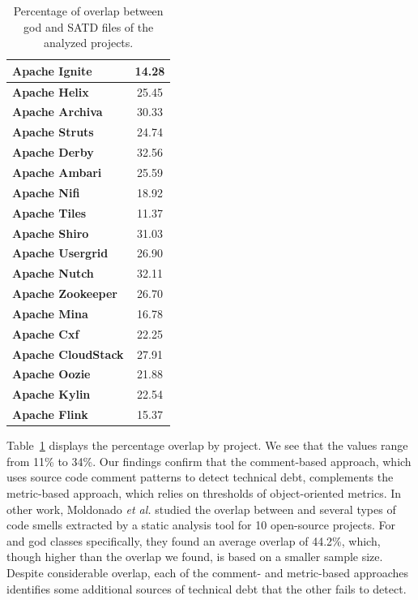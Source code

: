 \begin{table}[!htbp]
\begin{tabular}{l|c}
		\textbf{Apache Ignite}     &    14.28     \\ \hline
		\textbf{Apache Helix}      &    25.45     \\ \hline
		\textbf{Apache Archiva}    &    30.33     \\ \hline
		\textbf{Apache Struts}     &    24.74     \\ \hline
		\textbf{Apache Derby}      &    32.56     \\ \hline
		\textbf{Apache Ambari}     &    25.59     \\ \hline
		\textbf{Apache Nifi}       &    18.92     \\ \hline
		\textbf{Apache Tiles}      &    11.37     \\ \hline
		\textbf{Apache Shiro}      &    31.03     \\ \hline
		\textbf{Apache Usergrid}   &    26.90     \\ \hline
		\textbf{Apache Nutch}      &    32.11     \\ \hline
		\textbf{Apache Zookeeper}  &    26.70     \\ \hline
		\textbf{Apache Mina}       &    16.78     \\ \hline
		\textbf{Apache Cxf}        &    22.25     \\ \hline
		\textbf{Apache CloudStack} &    27.91     \\ \hline
		\textbf{Apache Oozie}      &    21.88     \\ \hline
		\textbf{Apache Kylin}      &    22.54     \\ \hline
		\textbf{Apache Flink}      &    15.37     \\ \hline
	\end{tabular}
	\caption{Percentage of overlap between god and SATD files of the analyzed projects.}
	\label{ch4_amount_of_overlap}
\end{table}

Table~\ref{ch4_amount_of_overlap} displays the percentage overlap by project. We see that the values range from 11\% to 34\%. Our findings confirm that the comment-based approach, which uses source code comment patterns to detect technical debt, complements the metric-based approach, which relies on thresholds of object-oriented metrics. In other work, Moldonado \textit{et al.} \cite{Maldonado_TSE2017} studied the overlap between \SATD and several types of code smells extracted by a static analysis tool for 10 open-source projects. For \SATD and god classes specifically, they found an average overlap of 44.2\%, which, though higher than the overlap we found, is based on a smaller sample size. Despite considerable overlap, each of the comment- and metric-based approaches identifies some additional sources of technical debt that the other fails to detect.

